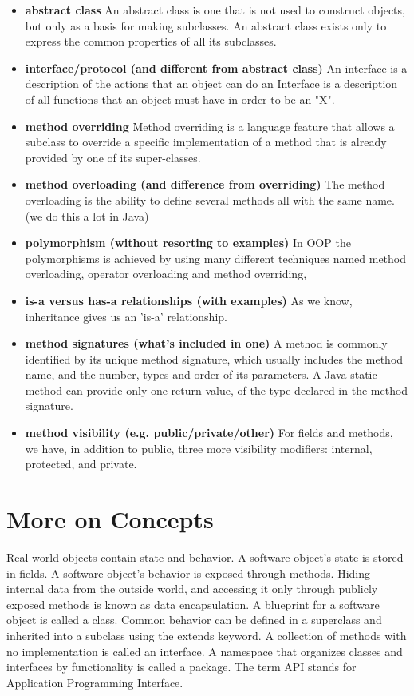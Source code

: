 \documentclass[letterpaper]{article}
\begin{document}
\begin{itemize}
		
\item {\bf abstract class
}	An abstract class is one that is not used to construct objects, but only as a basis for making subclasses. An abstract class exists only to express the common properties of all its subclasses. 

\item {\bf interface/protocol (and different from abstract class)
}	An interface is a description of the actions that an object can do
	an Interface is a description of all functions that an object must have in order to be an "X".

\item {\bf method overriding
}	Method overriding is a language feature that allows a subclass to override a specific implementation of a method that is already provided by one of its super-classes. 
\item {\bf 
method overloading (and difference from overriding)
}	The method overloading is the ability to define several methods all with the same name. 
	(we do this a lot in Java)
\item {\bf 
polymorphism (without resorting to examples)
}	In OOP the polymorphisms is achieved by using many different techniques 
	named method overloading, operator overloading and method overriding, 
\item {\bf 
is-a versus has-a relationships (with examples)
}	As we know, inheritance gives us an 'is-a' relationship.
\item {\bf 
method signatures (what's included in one)}
	A method is commonly identified by its unique method signature, which usually includes the method name, and the number, types and order of its parameters.
	A Java static method can provide only one return value, of the type declared in the method signature. 
\item {\bf 
method visibility (e.g. public/private/other)}
	For fields and methods, we have, in addition to public, three more visibility modifiers: internal, protected, and private.

\end{itemize}

\section{More on Concepts}
Real-world objects contain state and behavior.
A software object's state is stored in fields.
A software object's behavior is exposed through methods.
Hiding internal data from the outside world, and accessing it only through publicly exposed methods is known as data encapsulation.
A blueprint for a software object is called a class.
Common behavior can be defined in a superclass and inherited into a subclass using the extends keyword.
A collection of methods with no implementation is called an interface.
A namespace that organizes classes and interfaces by functionality is called a package.
The term API stands for Application Programming Interface.
\end{document}
